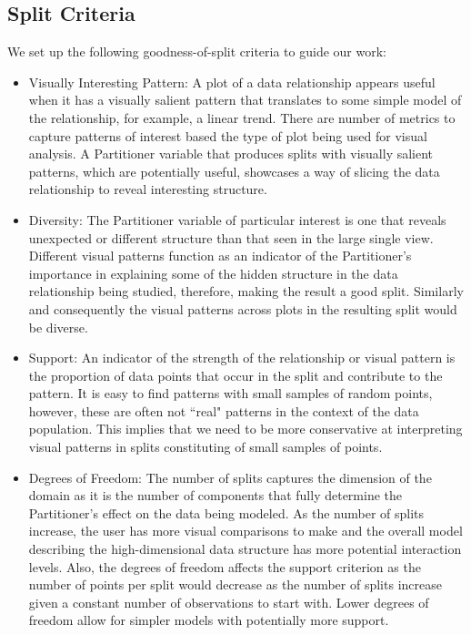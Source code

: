 \subsection{Split Criteria}
We set up the following goodness-of-split criteria to guide our work:
\begin{itemize}
\item Visually Interesting Pattern: A plot of a data relationship appears useful when it has a visually salient pattern that translates to some simple model of the relationship, for example, a linear trend. There are number of metrics to capture patterns of interest based the type of plot being used for visual analysis. A Partitioner variable that produces splits with visually salient patterns, which are potentially useful, showcases a way of slicing the data relationship to reveal interesting structure.
\item Diversity: The Partitioner variable of particular interest is one that reveals unexpected or different structure than that seen in the large single view. Different visual patterns function as an indicator of the Partitioner's importance in explaining some of the hidden structure in the data relationship being studied, therefore, making the result a good split. Similarly and consequently the visual patterns across plots in the resulting split would be diverse.
\item Support: An indicator of the strength of the relationship or visual pattern is the proportion of data points that occur in the split and contribute to the pattern. It is easy to find patterns with small samples of random points, however, these are often not ``real" patterns in the context of the data population. This implies that we need to be more conservative at interpreting visual patterns in splits constituting of small samples of points.
\item Degrees of Freedom: The number of splits captures the dimension of the domain as it is the number of components that fully determine the Partitioner's effect on the data being modeled. As the number of splits increase, the user has more visual comparisons to make and the overall model describing the high-dimensional data structure has more potential interaction levels. Also, the degrees of freedom affects the support criterion as the number of points per split would decrease as the number of splits increase given a constant number of observations to start with. Lower degrees of freedom allow for simpler models with potentially more support.
\end{itemize}

